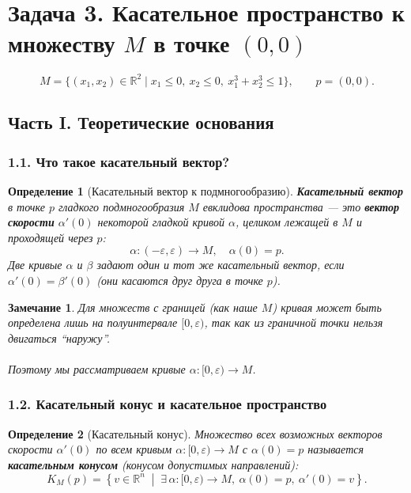\documentclass[12pt]{article}
\newtheorem{definition}{Определение}
\newtheorem{remark}{Замечание}
\begin{document}
\section*{Задача 3. Касательное пространство к множеству $M$ в точке $(0,0)$}

\[
M = \{(x_1, x_2) \in \mathbb{R}^2 \mid x_1 \le 0,\ x_2 \le 0,\ x_1^3 + x_2^3 \le 1\}, \qquad p = (0, 0).
\]

\subsection*{Часть I. Теоретические основания}

\subsubsection*{1.1. Что такое касательный вектор?}

\begin{definition}[Касательный вектор к подмногообразию]
\textbf{Касательный вектор} в точке $p$ гладкого подмногообразия $M$ евклидова пространства --- это \textbf{вектор скорости} $\alpha'(0)$ некоторой гладкой кривой $\alpha$, целиком лежащей в $M$ и проходящей через $p$:
\[
\alpha: (-\varepsilon, \varepsilon) \to M, \quad \alpha(0) = p.
\]
Две кривые $\alpha$ и $\beta$ задают один и тот же касательный вектор, если $\alpha'(0) = \beta'(0)$ (они \emph{касаются} друг друга в точке $p$).
\end{definition}

\begin{remark}
Для множеств с границей (как наше $M$) кривая может быть определена лишь на полуинтервале $[0, \varepsilon)$, так как из граничной точки нельзя двигаться ``наружу''.\\ 
\\
Поэтому мы рассматриваем кривые $\alpha: [0, \varepsilon) \to M$.
\end{remark}

\subsubsection*{1.2. Касательный конус и касательное пространство}

\begin{definition}[Касательный конус]
Множество всех возможных векторов скорости $\alpha'(0)$ по всем кривым $\alpha: [0, \varepsilon) \to M$ с $\alpha(0) = p$ называется \textbf{касательным конусом} (конусом допустимых направлений):
\[
K_M(p) = \left\{ v \in \mathbb{R}^n \;\middle|\; \exists\, \alpha: [0,\varepsilon) \to M,\ \alpha(0) = p,\ \alpha'(0) = v \right\}.
\]
\end{definition}
\end{document}
